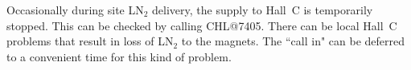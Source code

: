 {\begin{description}
\item{}\hskip0.3in Occasionally during site LN$_2$ delivery, the supply to
Hall~C
is temporarily stopped.  This can be checked by calling CHL@7405.  There
can be local Hall~C problems that result in loss of LN$_2$ to the
magnets. The ``call in" can be deferred to a convenient time for this
kind of problem.
\end{description}
%
%
}%

